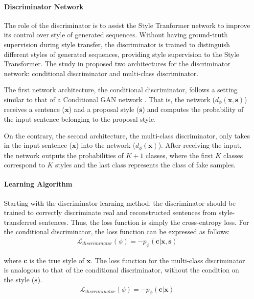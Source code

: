 \documentclass[acmsmall]{acmart}
\begin{document}
\paragraph{Discriminator Network} The role of the discriminator is to assist the Style Tranformer network to improve its control over style of generated sequences. Without having ground-truth supervision during style transfer, the discriminator is trained to distinguish different styles of generated sequences, providing style supervision to the Style Transformer. The study in \cite{style-transformer} proposed two architectures for the discriminator network: conditional discriminator and multi-class discriminator.

The first network architecture, the conditional discriminator, follows a setting similar to that of a Conditional GAN network \cite{cond-gan}. That is, the network ($d_{\phi}(\mathbf{x}, \mathbf{s})$) receives a sentence ($\mathbf{x}$) and a proposal style ($\mathbf{s}$) and computes the probability of the input sentence belonging to the proposal style.

On the contrary, the second architecture, the multi-class discriminator, only takes in the input sentence ($\mathbf{x}$) into the network ($d_{\phi}(\mathbf{x})$). After receiving the input, the network outputs the probabilities of $K + 1$ classes, where the first $K$ classes correspond to $K$ styles and the last class represents the class of fake samples.

\paragraph{Learning Algorithm} Starting with the discriminator learning method, the discriminator should be trained to correctly discriminate real and reconstructed sentences from style-transferred sentences. Thus, the loss function is simply the cross-entropy loss. For the conditional discriminator, the loss function can be expressed as follows:
\begin{gather}
    \mathcal{L}_{discriminator}(\phi) = -p_{\phi}(\mathbf{c}|\mathbf{x}, \mathbf{s})
\end{gather}

where $\mathbf{c}$ is the true style of $\mathbf{x}$. The loss function for the multi-class discriminator is analogous to that of the conditional discriminator, without the condition on the style ($\mathbf{s}$).
\begin{gather}
    \mathcal{L}_{discriminator}(\phi) = -p_{\phi}(\mathbf{c}|\mathbf{x})
\end{gather}
\end{document}
